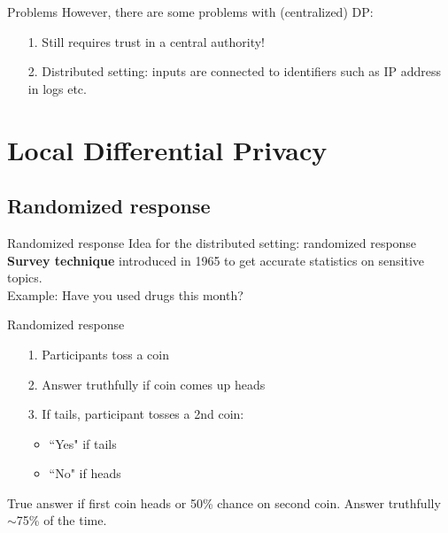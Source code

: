 \documentclass[aspectratio=43]{beamer}
\begin{document}
\begin{frame}{Problems}
    However, there are some problems with (centralized) DP:\\
    \medskip
    \begin{itemize}
        \item[1.] Still requires trust in a central authority!
        \item[2.] Distributed setting: inputs are connected to identifiers such as IP address in logs etc.
    \end{itemize}
\end{frame}


\section{Local Differential Privacy}

\subsection{Randomized response}

\begin{frame}{Randomized response}
    Idea for the distributed setting: randomized response\\
    \bigskip
    \textbf{Survey technique} introduced in 1965 to get accurate statistics on sensitive topics.\\
    \medskip 
    Example: Have you used drugs this month?
\end{frame}


\begin{frame}{Randomized response}
  \begin{itemize}
        \item[1.] Participants toss a coin
        \item[2.] Answer truthfully if coin comes up heads
        \item[3.] If tails, participant tosses a 2nd coin:
        \begin{itemize}
            \item ``Yes" if tails
            \item ``No" if heads
        \end{itemize}
    \end{itemize}
    \bigskip
    True answer if first coin heads or 50\% chance on second coin. Answer truthfully $\sim$75\% of the time.
\end{frame}
\end{document}
